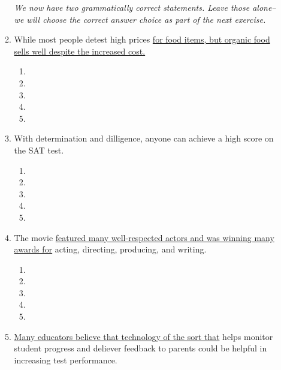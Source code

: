 \documentclass[12pt]{book}
\begin{document}
\begin{enumerate}
\begin{enumerate}
\bigskip
\textit{We now have two grammatically correct statements. Leave those alone-- we will choose the correct answer choice as part of the next exercise.}


\bigskip
\item While most people detest high prices \ul{for food items, but organic food sells well despite the increased cost.}

\bigskip
\begin{enumerate}[label=(\Alph*)]

\item        \hrulefill
\item   \hrulefill
\item    \hrulefill
\item    \hrulefill
\item   \hrulefill
\end{enumerate}

\bigskip
\item With determination and dilligence, anyone can achieve a high score on the SAT test. 

\bigskip
\begin{enumerate}[label=(\Alph*)]

\item        \hrulefill
\item   \hrulefill
\item    \hrulefill
\item    \hrulefill
\item   \hrulefill
\end{enumerate}

\bigskip
\item The movie \ul{featured many well-respected actors and was winning many awards for} acting, directing, producing, and writing. 

\bigskip
\begin{enumerate}[label=(\Alph*)]

\item        \hrulefill
\item   \hrulefill
\item    \hrulefill
\item    \hrulefill
\item   \hrulefill
\end{enumerate}

\bigskip
\item \ul{Many educators believe that technology of the sort that} helps monitor student progress and deliever feedback to parents could be helpful in increasing test performance. 


\end{enumerate}
\end{enumerate}
\end{document}
